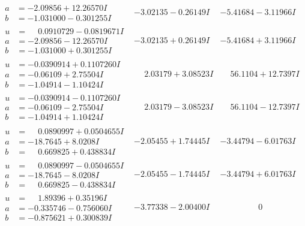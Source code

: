 \documentclass[1p]{elsarticle_modified}
\theoremstyle{definition}
\begin{document}
$$\begin{array}{c|c|c}
\begin{aligned}
a &= -2.09856 + 12.26570 I \\
b &= -1.031000 - 0.301255 I\end{aligned}
 & -3.02135 - 0.26149 I & -5.41684 - 3.11966 I \\ \hline\begin{aligned}
u &= \phantom{-}0.0910729 - 0.0819671 I \\
a &= -2.09856 - 12.26570 I \\
b &= -1.031000 + 0.301255 I\end{aligned}
 & -3.02135 + 0.26149 I & -5.41684 + 3.11966 I \\ \hline\begin{aligned}
u &= -0.0390914 + 0.1107260 I \\
a &= -0.06109 + 2.75504 I \\
b &= -1.04914 - 1.10424 I\end{aligned}
 & \phantom{-}2.03179 + 3.08523 I & \phantom{-}56.1104 + 12.7397 I \\ \hline\begin{aligned}
u &= -0.0390914 - 0.1107260 I \\
a &= -0.06109 - 2.75504 I \\
b &= -1.04914 + 1.10424 I\end{aligned}
 & \phantom{-}2.03179 - 3.08523 I & \phantom{-}56.1104 - 12.7397 I \\ \hline\begin{aligned}
u &= \phantom{-}0.0890997 + 0.0504655 I \\
a &= -18.7645 + 8.0208 I \\
b &= \phantom{-}0.669825 + 0.438834 I\end{aligned}
 & -2.05455 + 1.74445 I & -3.44794 - 6.01763 I \\ \hline\begin{aligned}
u &= \phantom{-}0.0890997 - 0.0504655 I \\
a &= -18.7645 - 8.0208 I \\
b &= \phantom{-}0.669825 - 0.438834 I\end{aligned}
 & -2.05455 - 1.74445 I & -3.44794 + 6.01763 I \\ \hline\begin{aligned}
u &= \phantom{-}1.89396 + 0.35196 I \\
a &= -0.335746 - 0.756060 I \\
b &= -0.875621 + 0.300839 I\end{aligned}
 & -3.77338 - 2.00400 I & \phantom{-0.000000 } 0 \\ \hline\begin{aligned}

\end{aligned}
\end{array}$$
\end{document}
